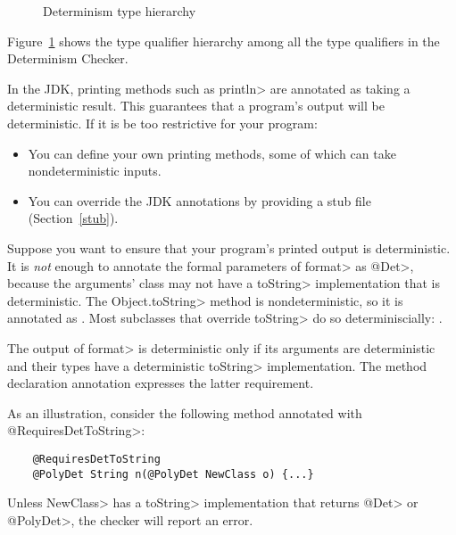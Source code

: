 \begin{figure}
    \begin{center}
    \end{center}
    \caption{Determinism type hierarchy}
    \label{fig-determinism-all-hierarchy}
\end{figure}
Figure~\ref{fig-determinism-all-hierarchy} shows the type qualifier hierarchy among all the
type qualifiers in the Determinism Checker.


In the JDK, printing methods such as \<println> are annotated as taking a
deterministic result.  This guarantees that a program's output will be
deterministic.  If it is be too restrictive for your program:
\begin{itemize}
\item
  You can define your own printing methods, some of which can take
  nondeterministic inputs.
\item
  You can override the JDK annotations by providing a stub file
  (Section~\ref{stub}).
\end{itemize}



Suppose you want to ensure that your program's printed output is
deterministic.
It is \emph{not} enough to annotate the formal parameters of \<format> as
\<@Det>, because the arguments' class may not have a \<toString> implementation that is deterministic.
The \<Object.toString> method is nondeterministic, so it is annotated as
.  Most subclasses
that override \<toString> do so determiniscially:
.

The output of \<format> is deterministic only if its arguments are
deterministic and their types have a deterministic \<toString> implementation.
The method declaration annotation
 expresses the
latter requirement.

As an illustration, consider the following method annotated with \<@RequiresDetToString>:
\begin{Verbatim}
    @RequiresDetToString
    @PolyDet String n(@PolyDet NewClass o) {...}
\end{Verbatim}
Unless \<NewClass> has a \<toString> implementation that returns \<@Det> or \<@PolyDet>,
the checker will report an error.

